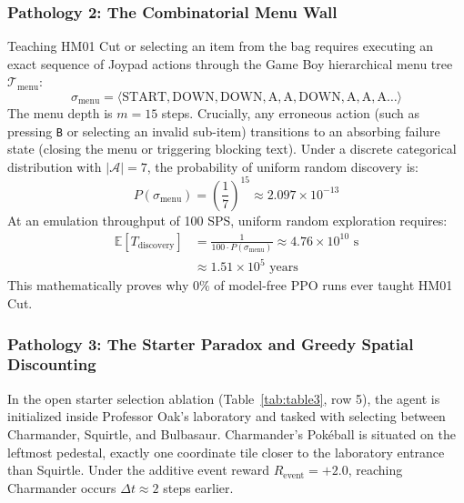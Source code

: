 \documentclass[conference]{IEEEtran}
\begin{document}
\subsubsection{Pathology 2: The Combinatorial Menu Wall}
Teaching HM01 Cut or selecting an item from the bag requires executing an exact sequence of Joypad actions through the Game Boy hierarchical menu tree $\mathcal{T}_{\text{menu}}$:
\begin{equation}
\sigma_{\text{menu}} = \langle \text{START}, \text{DOWN}, \text{DOWN}, \text{A}, \text{A}, \text{DOWN}, \text{A}, \text{A}, \text{A} \dots \rangle
\end{equation}
The menu depth is $m = 15$ steps. Crucially, any erroneous action (such as pressing \texttt{B} or selecting an invalid sub-item) transitions to an absorbing failure state (closing the menu or triggering blocking text). Under a discrete categorical distribution with $|\mathcal{A}| = 7$, the probability of uniform random discovery is:
\begin{equation}
P(\sigma_{\text{menu}}) = \left( \frac{1}{7} \right)^{15} \approx 2.097 \times 10^{-13}
\end{equation}
At an emulation throughput of 100 SPS, uniform random exploration requires:
\begin{align}
\mathbb{E}[T_{\text{discovery}}] &= \frac{1}{100 \cdot P(\sigma_{\text{menu}})} \approx 4.76 \times 10^{10}\text{ s} \nonumber \\
&\approx 1.51 \times 10^5\text{ years}
\end{align}
This mathematically proves why $0\%$ of model-free PPO runs ever taught HM01 Cut.

\subsubsection{Pathology 3: The Starter Paradox and Greedy Spatial Discounting}
In the open starter selection ablation (Table~\ref{tab:table3}, row 5), the agent is initialized inside Professor Oak's laboratory and tasked with selecting between Charmander, Squirtle, and Bulbasaur. Charmander's Pok{\'e}ball is situated on the leftmost pedestal, exactly one coordinate tile closer to the laboratory entrance than Squirtle. Under the additive event reward $R_{\text{event}} = +2.0$, reaching Charmander occurs $\Delta t \approx 2$ steps earlier.
\end{document}
